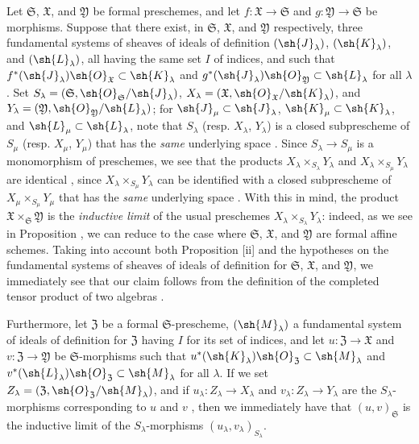 \begin{env}[10.7.4]
\label{I.10.7.4}
Let $\mathfrak{S}$, $\mathfrak{X}$, and $\mathfrak{Y}$ be formal preschemes, and let $f:\mathfrak{X}\to\mathfrak{S}$ and $g:\mathfrak{Y}\to\mathfrak{S}$ be morphisms.
Suppose that there exist, in $\mathfrak{S}$, $\mathfrak{X}$, and $\mathfrak{Y}$ respectively, three fundamental systems of sheaves of ideals of definition $(\sh{J}_\lambda)$, $(\sh{K}_\lambda)$, and $(\sh{L}_\lambda)$, all having the same set $I$ of indices, and such that $f^*(\sh{J}_\lambda)\sh{O}_\mathfrak{X}\subset\sh{K}_\lambda$ and $g^*(\sh{J}_\lambda)\sh{O}_\mathfrak{Y}\subset\sh{L}_\lambda$ for all $\lambda$.
Set $S_\lambda=(\mathfrak{S},\sh{O}_\mathfrak{S}/\sh{J}_\lambda)$, $X_\lambda=(\mathfrak{X},\sh{O}_\mathfrak{X}/\sh{K}_\lambda)$, and $Y_\lambda=(\mathfrak{Y},\sh{O}_\mathfrak{Y}/\sh{L}_\lambda)$; for $\sh{J}_\mu\subset\sh{J}_\lambda$, $\sh{K}_\mu\subset\sh{K}_\lambda$, and $\sh{L}_\mu\subset\sh{L}_\lambda$, note that $S_\lambda$ (resp. $X_\lambda$, $Y_\lambda$) is a closed subprescheme of $S_\mu$ (resp. $X_\mu$, $Y_\mu$) that has the \emph{same}
underlying space .
Since $S_\lambda\to S_\mu$ is a monomorphism of preschemes, we see that the products $X_\lambda\times_{S_\lambda}Y_\lambda$ and $X_\lambda\times_{S_\mu}Y_\lambda$ are identical , since $X_\lambda\times_{S_\mu}Y_\lambda$ can be identified with a closed subprescheme of $X_\mu\times_{S_\mu}Y_\mu$ that has the \emph{same} underlying space .
With this in mind, the product $\mathfrak{X}\times_\mathfrak{S}\mathfrak{Y}$ is the \emph{inductive limit} of the usual preschemes $X_\lambda\times_{S_\lambda}Y_\lambda$: indeed, as we see in Proposition , we can reduce to the case where $\mathfrak{S}$, $\mathfrak{X}$, and $\mathfrak{Y}$ are formal affine schemes.
Taking into account both Proposition [ii] and the hypotheses on the fundamental systems of sheaves of ideals of definition for $\mathfrak{S}$, $\mathfrak{X}$, and $\mathfrak{Y}$, we immediately see that our claim follows from the definition of the completed tensor product of two algebras .

Furthermore, let $\mathfrak{Z}$ be a formal $\mathfrak{S}$-prescheme, $(\sh{M}_\lambda)$ a fundamental system of ideals of definition for $\mathfrak{Z}$ having $I$ for its set of indices, and let $u:\mathfrak{Z}\to\mathfrak{X}$ and $v:\mathfrak{Z}\to\mathfrak{Y}$ be $\mathfrak{S}$-morphisms such that $u^*(\sh{K}_\lambda)\sh{O}_\mathfrak{Z}\subset\sh{M}_\lambda$ and $v^*(\sh{L}_\lambda)\sh{O}_\mathfrak{Z}\subset\sh{M}_\lambda$ for all $\lambda$.
If we set $Z_\lambda=(\mathfrak{Z},\sh{O}_\mathfrak{Z}/\sh{M}_\lambda)$, and if $u_\lambda:Z_\lambda\to X_\lambda$ and $v_\lambda:Z_\lambda\to Y_\lambda$ are the $S_\lambda$-morphisms corresponding to $u$ and $v$ , then we immediately have that $(u,v)_\mathfrak{S}$ is the inductive limit of the $S_\lambda$-morphisms $(u_\lambda,v_\lambda)_{S_\lambda}$.


\end{env}
